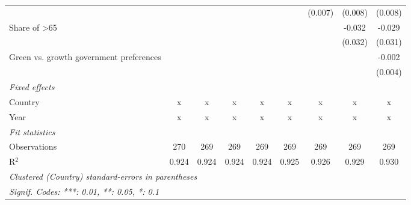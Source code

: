 \begin{table}[htbp]
\begin{tabular}{lcccccccc}
                                                &         &         &         &         &         & (0.007) & (0.008) & (0.008)\\   
      Share of >65                              &         &         &         &         &         &         & -0.032  & -0.029\\   
                                                &         &         &         &         &         &         & (0.032) & (0.031)\\   
      Green vs. growth government preferences   &         &         &         &         &         &         &         & -0.002\\   
                                                &         &         &         &         &         &         &         & (0.004)\\   
      \emph{Fixed effects}\\
      Country                                   & x       & x       & x       & x       & x       & x       & x       & x\\  
      Year                                      & x       & x       & x       & x       & x       & x       & x       & x\\  
      \midrule \emph{Fit statistics}\\
      Observations                              & 270     & 269     & 269     & 269     & 269     & 269     & 269     & 269\\  
      R$^2$                                     & 0.924   & 0.924   & 0.924   & 0.924   & 0.925   & 0.926   & 0.929   & 0.930\\  
      \midrule
      \multicolumn{9}{l}{\emph{Clustered (Country) standard-errors in parentheses}}\\
      \multicolumn{9}{l}{\emph{Signif. Codes: ***: 0.01, **: 0.05, *: 0.1}}\\
   \end{tabular}
\end{table}


